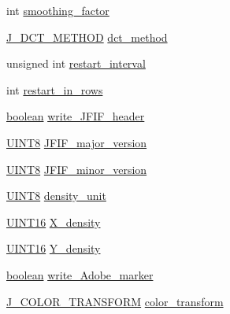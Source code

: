 \begin{DoxyCompactItemize}
int \mbox{\hyperlink{structjpeg__compress__struct_a0e14f65876566ff8eec195d124535307}{smoothing\+\_\+factor}}
\item 
\mbox{\hyperlink{jpeglib_8h_ae4245c819e9217a321fb23f1a106d563}{J\+\_\+\+D\+C\+T\+\_\+\+M\+E\+T\+H\+OD}} \mbox{\hyperlink{structjpeg__compress__struct_ab782f698c650e8ec5f9b47043691d3c1}{dct\+\_\+method}}
\item 
unsigned int \mbox{\hyperlink{structjpeg__compress__struct_a57ad1f6d9015e25fe272c645dcc3f71e}{restart\+\_\+interval}}
\item 
int \mbox{\hyperlink{structjpeg__compress__struct_a9636f9df88d5a3ae56f0bb9a5f923db7}{restart\+\_\+in\+\_\+rows}}
\item 
\mbox{\hyperlink{jmorecfg_8h_a7c6368b321bd9acd0149b030bb8275ed}{boolean}} \mbox{\hyperlink{structjpeg__compress__struct_a12178443b9177fd4bdddc66ce4e08e12}{write\+\_\+\+J\+F\+I\+F\+\_\+header}}
\item 
\mbox{\hyperlink{jmorecfg_8h_adfb9a8ea1dd59f151065f763e1e9acd6}{U\+I\+N\+T8}} \mbox{\hyperlink{structjpeg__compress__struct_a8e2468a5bffedad2257c715a59ded2e0}{J\+F\+I\+F\+\_\+major\+\_\+version}}
\item 
\mbox{\hyperlink{jmorecfg_8h_adfb9a8ea1dd59f151065f763e1e9acd6}{U\+I\+N\+T8}} \mbox{\hyperlink{structjpeg__compress__struct_a9653a22025ac9ff342d6f4221e2a9564}{J\+F\+I\+F\+\_\+minor\+\_\+version}}
\item 
\mbox{\hyperlink{jmorecfg_8h_adfb9a8ea1dd59f151065f763e1e9acd6}{U\+I\+N\+T8}} \mbox{\hyperlink{structjpeg__compress__struct_a8f3a056ed558bf7be4ff52999416a525}{density\+\_\+unit}}
\item 
\mbox{\hyperlink{jmorecfg_8h_a805c2c164bdd38d72a30c46e84fb568b}{U\+I\+N\+T16}} \mbox{\hyperlink{structjpeg__compress__struct_adef3c4b809ebca2a853b5659e177deaa}{X\+\_\+density}}
\item 
\mbox{\hyperlink{jmorecfg_8h_a805c2c164bdd38d72a30c46e84fb568b}{U\+I\+N\+T16}} \mbox{\hyperlink{structjpeg__compress__struct_a978dc1c187fab34211757a134ebf4adb}{Y\+\_\+density}}
\item 
\mbox{\hyperlink{jmorecfg_8h_a7c6368b321bd9acd0149b030bb8275ed}{boolean}} \mbox{\hyperlink{structjpeg__compress__struct_a39c549a441052b38df2dfd7359c68814}{write\+\_\+\+Adobe\+\_\+marker}}
\item 
\mbox{\hyperlink{jpeglib_8h_a26af503ae521188ce89abc2c7adee7f0}{J\+\_\+\+C\+O\+L\+O\+R\+\_\+\+T\+R\+A\+N\+S\+F\+O\+RM}} \mbox{\hyperlink{structjpeg__compress__struct_a3533c65068c4cec8f048019d2b1c0557}{color\+\_\+transform}}
\item 

\end{DoxyCompactItemize}
